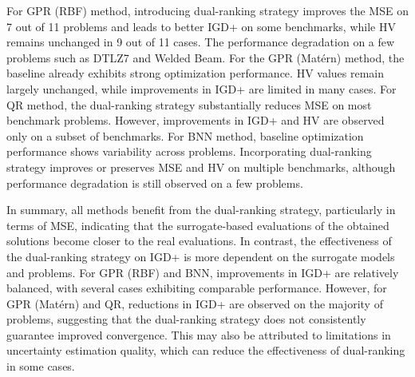\documentclass{article}
\begin{document}
For GPR (RBF) method, introducing dual-ranking strategy improves the MSE on 7 out of 11 problems and leads to better IGD+ on some benchmarks, while HV remains unchanged in 9 out of 11 cases. The performance degradation on a few problems such as DTLZ7 and Welded Beam. For the GPR (Mat\'ern) method, the baseline already exhibits strong optimization performance. HV values remain largely unchanged, while improvements in IGD+ are limited in many cases. For QR method, the dual-ranking strategy substantially reduces MSE on most benchmark problems. However, improvements in IGD+ and HV are observed only on a subset of benchmarks. For BNN method, baseline optimization performance shows variability across problems. Incorporating dual-ranking strategy improves or preserves MSE and HV on multiple benchmarks, although performance degradation is still observed on a few problems. 

In summary, all methods benefit from the dual-ranking strategy, particularly in terms of MSE, indicating that the surrogate-based evaluations of the obtained solutions become closer to the real evaluations. In contrast, the effectiveness of the dual-ranking strategy on IGD+ is more dependent on the surrogate models and problems. For GPR (RBF) and BNN, improvements in IGD+ are relatively balanced, with several cases exhibiting comparable performance. However, for GPR (Mat\'ern) and QR, reductions in IGD+ are observed on the majority of problems, suggesting that the dual-ranking strategy does not consistently guarantee improved convergence. This may also be attributed to limitations in uncertainty estimation quality, which can reduce the effectiveness of dual-ranking in some cases.
\end{document}
